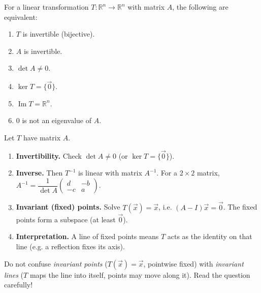 \documentclass[11pt]{article}
\begin{document}
\begin{propriete}
For a linear transformation $T:\mathbb{R}^n\to\mathbb{R}^n$ with matrix $A$, the following are equivalent:
\begin{enumerate}
\item $T$ is invertible (bijective).
\item $A$ is invertible.
\item $\det A\neq 0$.
\item $\ker T=\{\vec{0}\}$.
\item $\operatorname{Im} T=\mathbb{R}^n$.
\item $0$ is not an eigenvalue of $A$.
\end{enumerate}
\end{propriete}

\begin{methode}
Let $T$ have matrix $A$.
\begin{enumerate}
\item \textbf{Invertibility.} Check $\det A\neq 0$ (or $\ker T=\{\vec{0}\}$).
\item \textbf{Inverse.} Then $T^{-1}$ is linear with matrix $A^{-1}$. For a $2\times 2$ matrix, $A^{-1}=\dfrac{1}{\det A}\begin{pmatrix} d & -b \\ -c & a \end{pmatrix}$.
\item \textbf{Invariant (fixed) points.} Solve $T(\vec{x})=\vec{x}$, i.e. $(A-I)\vec{x}=\vec{0}$. The fixed points form a subspace (at least $\vec{0}$).
\item \textbf{Interpretation.} A line of fixed points means $T$ acts as the identity on that line (e.g. a reflection fixes its axis).
\end{enumerate}
\begin{attention}[Trap]
Do not confuse \emph{invariant points} ($T(\vec{x})=\vec{x}$, pointwise fixed) with \emph{invariant lines} ($T$ maps the line into itself, points may move along it). Read the question carefully!
\end{attention}
\end{methode}
\end{document}
